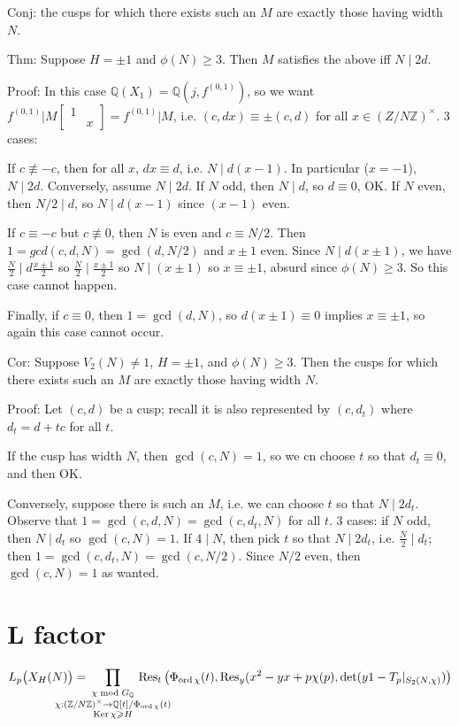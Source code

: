 \documentclass[12pt]{article}
\newcommand{\Z}{\mathbb{Z}}
\newcommand{\Q}{\mathbb{Q}}
\newcommand{\Ker}{\operatorname{Ker}}
\newcommand{\Res}{\operatorname{Res}}
\newcommand{\ord}{\operatorname{ord}}
\newcommand{\mact}{\big\vert}
\newcommand{\smat}[4]{\left[ \begin{smallmatrix} #1 & #2 \\ #3 & #4 \end{smallmatrix} \right]}
\theoremstyle{definition}
\begin{document}
Conj: the cusps for which there exists such an $M$ are exactly those having width $N$.

Thm: Suppose $H=\pm1$ and $\phi(N) \geqslant 3$. Then $M$ satisfies the above iff $N \mid 2d$.

Proof: In this case $\Q(X_1) = \Q(j,f^{(0,1)})$, so we want $f^{(0,1)}\mact M \smat{1}{}{}{x} = f^{(0,1)}\mact M$, i.e. $(c,dx) \equiv \pm (c,d)$ for all $x \in (Z/N\Z)^\times$. 3 cases:

If $c \not \equiv -c$, then for all $x$, $dx \equiv d$, i.e. $N \mid d(x-1)$. In particular ($x=-1$), $N \mid 2d$. Conversely, assume $N \mid 2d$. If $N$ odd, then $N \mid d$, so $d \equiv 0$, OK. If $N$ even, then $N/2 \mid d$, so $N \mid d(x-1)$ since $(x-1)$ even.

If $c \equiv -c$ but $c \not \equiv 0$, then $N$ is even and $c \equiv N/2$. Then $1 = gcd(c,d,N) = \gcd(d,N/2)$ and $x\pm1$ even. Since $N \mid d(x \pm 1) $, we have $\frac{N}2 \mid d \frac{x \pm 1}2$ so $\frac{N}2 \mid \frac{x \pm 1}2$ so $N \mid (x \pm 1)$ so $x \equiv \pm 1$, absurd since $\phi(N) \geqslant 3$. So this case cannot happen.

Finally, if $c \equiv 0$, then $1=\gcd(d,N)$, so $d(x\pm1) \equiv 0$ implies $x \equiv \pm 1$, so again this case cannot occur.


Cor: Suppose $V_2(N) \neq 1$, $H=\pm1$, and $\phi(N) \geqslant 3$. Then the cusps for which there exists such an $M$ are exactly those having width $N$.

Proof: Let $(c,d)$ be a cusp; recall it is also represented by $(c,d_t)$ where $d_t=d+tc$ for all $t$.

If the cusp has width $N$, then $\gcd(c,N)=1$, so we cn choose $t$ so that $d_t \equiv 0$, and then OK.

Conversely, suppose there is such an $M$, i.e. we can choose $t$ so that $N \mid 2 d_t$. Observe that $1 = \gcd(c,d,N) = \gcd(c,d_t,N)$ for all $t$. 3 cases: if $N$ odd, then $N \mid d_t$ so $\gcd(c,N)=1$. If $4 \mid N$, then pick $t$ so that $N \mid 2d_t$, i.e. $\frac{N}2 \mid d_t$; then $1 = \gcd(c,d_t,N) = \gcd(c,N/2)$. Since $N/2$ even, then $\gcd(c,N)=1$ as wanted.

\section{L factor}

\[ L_p\big(X_H(N)\big) = \hspace{-1cm} \prod_{\substack{\chi \bmod G_\Q \\ \chi : (\Z/N\Z)^\times \rightarrow \Q[t]/\Phi_{\ord \chi}(t) \\ \Ker \chi \geqslant H}} \hspace{-1cm} \Res_t\big( \Phi_{\ord \chi}(t),\Res_y(x^2-yx+p\chi(p), \det(y1-T_p \vert_{S_2(N,\chi)}) \big) \]
\end{document}
